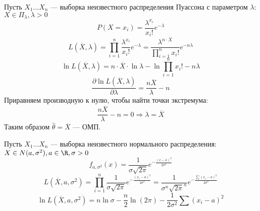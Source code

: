 \begin{example}
    Пусть \(X_1\dots X_n\) --- выборка неизвестного распределения Пуассона с параметром \(\lambda\): \(X \in \Pi_\lambda, \lambda > 0\)
    \[P(X = x_i) = \frac{\lambda^{x_i}}{x_i!} e^{ -\lambda}\]
    \[L(\overline{X}, \lambda) = \prod_{i=1}^{n} \frac{\lambda^{x_i}}{x_i!} e^{ -\lambda} = \frac{\lambda^{n \cdot \overline{X}}}{\prod_{i=1}^{n} x_i!} e^{ - n\lambda}\]
    \[\ln L(\overline{X}, \lambda) = n \cdot \overline{X} \cdot \ln \lambda - \ln \prod_{i=1}^{n} x_i! - n\lambda\]
    \[\frac{\partial \ln L(\overline{X}, \lambda)}{\partial \lambda} = \frac{n \overline{X}}{\lambda} - n\]
    Приравняем производную к нулю, чтобы найти точки экстремума:
    \[\frac{n \overline{X}}{\lambda} - n = 0 \Rightarrow \lambda = \overline{X}\]
    Таким образом \(\hat{\theta} = \overline{X}\) --- ОМП.
\end{example}

\begin{example}
    Пусть \(X_1\dots X_n\) --- выборка неизвестного нормального распределения: \(X \in N(a, \sigma^2), a \in \R, \sigma > 0\)
    \[f_{a, \sigma^2}(x) = \frac{1}{\sigma \sqrt{2 \pi}} e^{ -\frac{(x - a)^2}{2\sigma^2}}\]
    \[L(\overline{X}, a, \sigma^2) = \prod_{i=1}^{n} \frac{1}{\sigma \sqrt{2 \pi}} e^{ -\frac{(x_i - a)^2}{2\sigma^2}} = \frac{1}{\sigma^n \sqrt{2 \pi}^n} e^{ -\frac{\sum (x_i - a)^2}{2\sigma^2}}\]
    \[\ln L(\overline{X}, a, \sigma^2) = n \ln \sigma - \frac{n}{2} \ln (2 \pi) - \frac{1}{2\sigma^2} \sum (x_i - a)^2\]
    \unfinished
\end{example}

